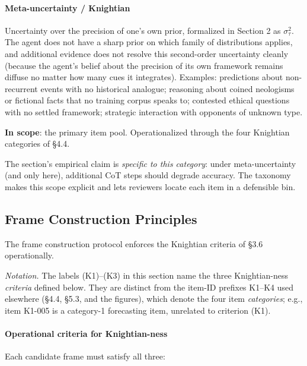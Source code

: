 \documentclass{article}
\begin{document}
\paragraph{Meta-uncertainty /
Knightian}\label{meta-uncertainty-knightian}

Uncertainty over the precision of one's own prior, formalized in Section 2 as \(\sigma_{\tau}^{2}\). The agent does not have a sharp prior on
which family of distributions applies, and additional evidence does not
resolve this second-order uncertainty cleanly (because the agent's
belief about the precision of its own framework remains diffuse no
matter how many cues it integrates). Examples: predictions about
non-recurrent events with no historical analogue; reasoning about coined
neologisms or fictional facts that no training corpus speaks to;
contested ethical questions with no settled framework; strategic
interaction with opponents of unknown type.

\textbf{In scope}: the primary item pool. Operationalized through the
four Knightian categories of \S{}4.4.

The section's empirical claim is \emph{specific to this category}: under
meta-uncertainty (and only here), additional CoT steps should degrade
accuracy. The taxonomy makes this scope explicit and lets reviewers
locate each item in a defensible bin.

\subsection{Frame Construction
Principles}\label{frame-construction-principles}

The frame construction protocol enforces the Knightian criteria of \S{}3.6
operationally.

\emph{Notation.} The labels (K1)--(K3) in this section name the three
Knightian-ness \emph{criteria} defined below. They are distinct from the
item-ID prefixes K1--K4 used elsewhere (\S{}4.4, \S{}5.3, and the figures),
which denote the four item \emph{categories}; e.g., item K1-005 is a
category-1 forecasting item, unrelated to criterion (K1).

\paragraph{Operational criteria for
Knightian-ness}\label{operational-criteria-for-knightian-ness}

Each candidate frame must satisfy all three:
\end{document}
